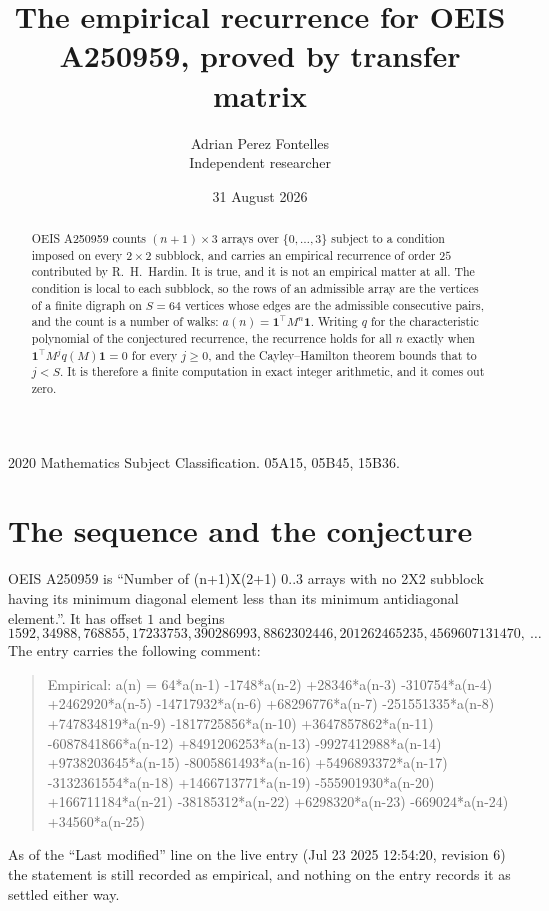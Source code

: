\documentclass[11pt,a4paper]{article}
\title{The empirical recurrence for OEIS A250959, proved by transfer matrix}
\author{Adrian Perez Fontelles\\ \small Independent researcher}
\date{31 August 2026}
\theoremstyle{plain}
\theoremstyle{definition}
\begin{document}
\maketitle

\begin{abstract}
OEIS A250959 counts $(n+1)\times3$ arrays over $\{0,\dots,3\}$ subject to a condition imposed on
every $2\times2$ subblock, and carries an empirical recurrence of order $25$ contributed
by R.~H.~Hardin. It is true, and it is not an empirical matter at all. The condition is local
to each subblock, so the rows of an admissible array are the vertices of a finite digraph
on $S=64$ vertices whose edges are the admissible consecutive pairs, and the count is a
number of walks: $a(n)=\mathbf{1}^{\!\top}M^{n}\mathbf{1}$. Writing $q$
for the characteristic polynomial of the conjectured recurrence, the recurrence holds for all
$n$ exactly when $\mathbf{1}^{\!\top}M^{j}q(M)\mathbf{1}=0$ for every $j\ge0$, and the
Cayley--Hamilton theorem bounds that to $j<S$. It is therefore a finite computation in exact
integer arithmetic, and it comes out zero.
\end{abstract}

\noindent\small 2020 Mathematics Subject Classification. 05A15, 05B45, 15B36.\normalsize

\section{The sequence and the conjecture}

OEIS A250959 is ``Number of (n+1)X(2+1) 0..3 arrays with no 2X2 subblock having its minimum diagonal element less than its minimum antidiagonal element.''. It has offset $1$ and begins
\[
1592, 34988, 768855, 17233753, 390286993, 8862302446, 201262465235, 4569607131470,\ \dots
\]
The entry carries the following comment:
\begin{quote}\small
Empirical: a(n) = 64*a(n-1) -1748*a(n-2) +28346*a(n-3) -310754*a(n-4) +2462920*a(n-5) -14717932*a(n-6) +68296776*a(n-7) -251551335*a(n-8) +747834819*a(n-9) -1817725856*a(n-10) +3647857862*a(n-11) -6087841866*a(n-12) +8491206253*a(n-13) -9927412988*a(n-14) +9738203645*a(n-15) -8005861493*a(n-16) +5496893372*a(n-17) -3132361554*a(n-18) +1466713771*a(n-19) -555901930*a(n-20) +166711184*a(n-21) -38185312*a(n-22) +6298320*a(n-23) -669024*a(n-24) +34560*a(n-25)
\end{quote}
As of the ``Last modified'' line on the live entry (Jul 23 2025 12:54:20, revision 6) the statement is
still recorded as empirical, and nothing on the entry records it as settled either way.
\end{document}
